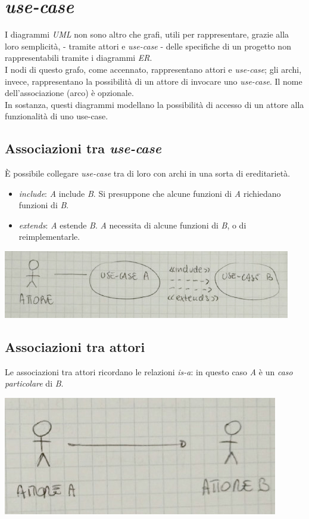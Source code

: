\section{\textit{use-case}}
I diagrammi \textit{UML} non sono altro che grafi, utili per rappresentare, grazie alla loro semplicità, - tramite attori e \textit{use-case} - delle specifiche di un progetto non rappresentabili tramite i diagrammi \textit{ER}. \\
I nodi di questo grafo, come accennato, rappresentano attori e \textit{use-case}; gli archi, invece, rappresentano la possibilità di un attore di invocare uno \textit{use-case}. Il nome dell'associazione (arco) è opzionale. \\
In sostanza, questi diagrammi modellano la possibilità di accesso di un attore alla funzionalità di uno use-case.

\subsection{Associazioni tra \textit{use-case}}
È possibile collegare \textit{use-case} tra di loro con archi in una sorta di ereditarietà.
\begin{itemize}
    \item \textit{include}: \textit{A} include \textit{B}. Si presuppone che alcune funzioni di \textit{A} richiedano funzioni di \textit{B}.
    \item \textit{extends}: \textit{A} estende \textit{B}. \textit{A} necessita di alcune funzioni di \textit{B}, o di reimplementarle.
\end{itemize}
\begin{center}
    \includegraphics[width=.7\textwidth]{res/uml-usecase1.jpg} \hfill
\end{center}
\newpage

\subsection{Associazioni tra attori}
Le associazioni tra attori ricordano le relazioni \textit{is-a}: in questo caso \textit{A} è un \textit{caso particolare} di \textit{B}.
\begin{center}
    \includegraphics[width=.7\textwidth]{res/uml-usecase2.jpg} \hfill
\end{center}

